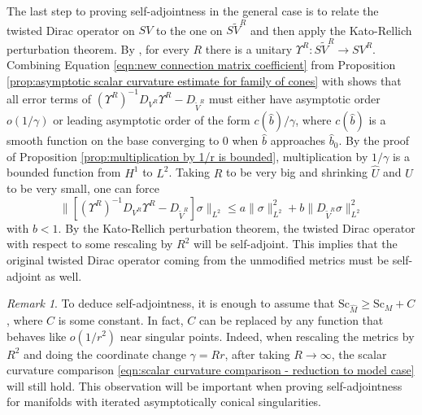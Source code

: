 \documentclass[12pt, reqno]{amsart}
\theoremstyle{plain} %
\theoremstyle{definition}
\theoremstyle{remark}
\newtheorem{remark}[theorem]{Remark}
\numberwithin{equation}{section}
\newcommand{\dom}[1]{\hat{#1}}
\newcommand{\norm}[1]{\lVert #1 \rVert}
\newcommand{\Sc}{\mathrm{Sc}}
\begin{document}
The last step to proving self-adjointness in the general case is to relate the twisted Dirac operator on \(SV\) to the one on \(S\widetilde{V}^R\) and then apply the Kato-Rellich perturbation theorem.
By \cite[pp.~7-8]{Bourguignon:1992}, for every \(R\) there is a unitary \( \Upsilon^R \colon S\widetilde{V}^R \to SV^R\).
Combining Equation \eqref{eqn:new connection matrix coefficient} from Proposition \ref{prop:asymptotic scalar curvature estimate for family of cones} with \cite[Theorem~3.1]{Bourguignon:1992} shows that all error terms of \((\Upsilon^R)^{-1} D_{V^R} \Upsilon^R - D_{\widetilde{V}^R}\) must either have asymptotic order \(o(1/\gamma)\) or leading asymptotic order of the form \(c(\dom{b})/\gamma\), where \(c(\dom{b})\) is a smooth function on the base converging to 0 when \(\dom{b}\) approaches \(\dom{b}_0\). By the proof of Proposition \ref{prop:multiplication by 1/r is bounded}, multiplication by \(1/\gamma\) is a bounded function from \(H^1\) to \(L^2\).
Taking \(R\) to be very big and shrinking \(\dom{U}\) and \(U\) to be very small, one can force
\begin{equation*}
    \norm{\left[ (\Upsilon^R)^{-1} D_{V^R} \Upsilon^R - D_{\widetilde{V}^R} \right] \sigma}_{L^2} \leq a \norm{ \sigma }_{L^2}^2 + b \norm{ D_{\widetilde{V}^R}\sigma }_{L^2}^2
\end{equation*}
with \(b < 1\).
By the Kato-Rellich perturbation theorem, the twisted Dirac operator with respect to some rescaling by \(R^2\) will be self-adjoint.
This implies that the original twisted Dirac operator coming from the unmodified metrics must be self-adjoint as well.
\begin{remark}\label{rem:self-adjointness can be proven with weaker lower bound on scalar curvature}
    To deduce self-adjointness, it is enough to assume that \(\Sc_{\dom{M}} \geq \Sc_M + C\), where \(C\) is some constant.
    In fact, \(C\) can be replaced by any function that behaves like \(o(1/r^2)\) near singular points.
    Indeed, when rescaling the metrics by \(R^2\) and doing the coordinate change \(\gamma = Rr\), after taking \(R \to \infty\), the scalar curvature comparison \eqref{eqn:scalar curvature comparison - reduction to model case} will still hold.
    This observation will be important when proving self-adjointness for manifolds with iterated asymptotically conical singularities.
\end{remark}
\end{document}
